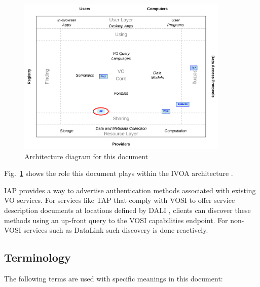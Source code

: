 \documentclass[11pt,a4paper]{ivoa}
\begin{document}
\begin{figure}
\centering


\includegraphics[width=0.9\textwidth]{role_diagram.pdf}
\caption{Architecture diagram for this document}
\label{fig:archdiag}
\end{figure}

Fig.~\ref{fig:archdiag} shows the role this document plays within the
IVOA architecture \citep{2021ivoa.spec.1101D}.

IAP provides a way to advertise authentication methods
associated with existing VO services.
For services like TAP \citep{2019ivoa.spec.0927D}
that comply with VOSI \citep{2017ivoa.spec.0524G} to
offer service description documents at locations
defined by DALI \citep{2017ivoa.spec.0517D},
clients can discover these methods
using an up-front query to the VOSI capabilities endpoint.
For non-VOSI services such as DataLink \citep{2015ivoa.spec.0617D}
such discovery is done reactively.


\subsection{Terminology}

The following terms are used with specific meanings in this document:
\end{document}
